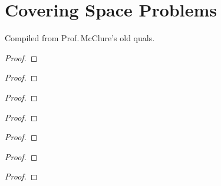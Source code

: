 \chapter{Covering Space Problems}
Compiled from Prof.\,McClure's old quals.
\begin{problem}
\end{problem}
\begin{proof}
\end{proof}

\begin{problem}
\end{problem}
\begin{proof}
\end{proof}

\begin{problem}
\end{problem}
\begin{proof}
\end{proof}

\begin{problem}
\end{problem}
\begin{proof}
\end{proof}

\begin{problem}
\end{problem}
\begin{proof}
\end{proof}

\begin{problem}
\end{problem}
\begin{proof}
\end{proof}

\begin{problem}
\end{problem}
\begin{proof}
\end{proof}
